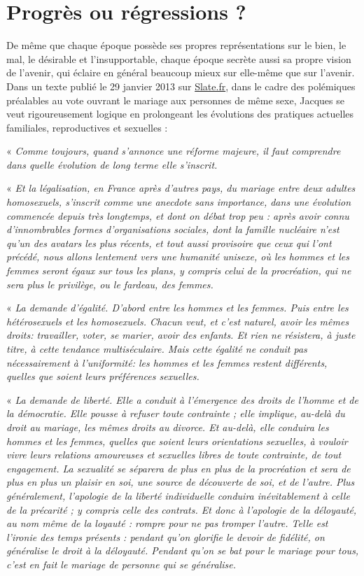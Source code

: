 

\chapter{Progrès ou régressions ?}


 De même que chaque époque possède ses propres représentations sur le bien, le mal, le désirable et l'insupportable, chaque époque secrète aussi sa propre vision de l'avenir, qui éclaire en général beaucoup mieux sur elle-même que sur l'avenir. Dans un texte publié le 29 janvier 2013 sur \href{http://www.slate.fr}{Slate.fr}, dans le cadre des polémiques préalables au vote ouvrant le mariage aux personnes de même sexe, Jacques  se veut rigoureusement logique en prolongeant les évolutions des pratiques actuelles familiales, reproductives et sexuelles : 


« \emph{Comme toujours, quand s'annonce une réforme majeure, il faut comprendre dans quelle évolution de long terme elle s'inscrit.}
 
« \emph{Et la légalisation, en France après d'autres pays, du mariage entre deux adultes homosexuels, s'inscrit comme une anecdote sans importance, dans une évolution commencée depuis très longtemps, et dont on débat trop peu : après avoir connu d'innombrables formes d'organisations sociales, dont la famille nucléaire n'est qu'un des avatars les plus récents, et tout aussi provisoire que ceux qui l'ont précédé, nous allons lentement vers une humanité unisexe, où les hommes et les femmes seront égaux sur tous les plans, y compris celui de la procréation, qui ne sera plus le privilège, ou le fardeau, des femmes.} 
 
« \emph{\primo La demande d'égalité. D'abord entre les hommes et les femmes. Puis entre les hétérosexuels et les homosexuels. Chacun veut, et c'est naturel, avoir les mêmes droits: travailler, voter, se marier, avoir des enfants. Et rien ne résistera, à juste titre, à cette tendance multiséculaire. Mais cette égalité ne conduit pas nécessairement à l'uniformité: les hommes et les femmes restent différents, quelles que soient leurs préférences sexuelles.}
 
« \emph{\secundo La demande de liberté. Elle a conduit à l'émergence des droits de l'homme et de la démocratie. Elle pousse à refuser toute contrainte ; elle implique, au-delà du droit au mariage, les mêmes droits au divorce. Et au-delà, elle conduira les hommes et les femmes, quelles que soient leurs orientations sexuelles, à vouloir vivre leurs relations amoureuses et sexuelles libres de toute contrainte, de tout engagement. La sexualité se séparera de plus en plus de la procréation et sera de plus en plus un plaisir en soi, une source de découverte de soi, et de l'autre. Plus généralement, l'apologie de la liberté individuelle conduira inévitablement à celle de la précarité ; y compris celle des contrats. Et donc à l'apologie de la déloyauté, au nom même de la loyauté : rompre pour ne pas tromper l'autre. Telle est l'ironie des temps présents : pendant qu'on glorifie le devoir de fidélité, on généralise le droit à la déloyauté. Pendant qu'on se bat pour le mariage pour tous, c'est en fait le mariage de personne qui se généralise.}
 
